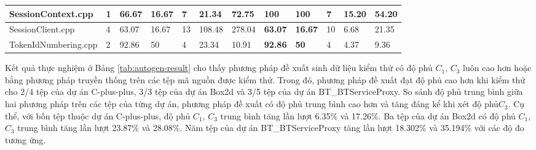 \begin{table}[h]
{\begin{tabular}{|l|l|lllll|lllll|}
SessionContext.cpp                                   & 1                                                   & \multicolumn{1}{l|}{66.67} & \multicolumn{1}{l|}{16.67} & \multicolumn{1}{l|}{7}   & \multicolumn{1}{l|}{21.34}   & 72.75                     & \multicolumn{1}{l|}{\textbf{100}}   & \multicolumn{1}{l|}{\textbf{100}}   & \multicolumn{1}{l|}{7}   & \multicolumn{1}{l|}{15.20}   & 54.20                     \\ \hline
SessionClient.cpp                                    & 4                                                   & \multicolumn{1}{l|}{63.07} & \multicolumn{1}{l|}{16.67} & \multicolumn{1}{l|}{13}  & \multicolumn{1}{l|}{108.48}  & 278.04                    & \multicolumn{1}{l|}{\textbf{63.07}} & \multicolumn{1}{l|}{\textbf{16.67}} & \multicolumn{1}{l|}{10}  & \multicolumn{1}{l|}{6.68}    & 21.35                     \\ \hline
TokenIdNumbering.cpp                                 & 2                                                   & \multicolumn{1}{l|}{92.86} & \multicolumn{1}{l|}{50}    & \multicolumn{1}{l|}{4}   & \multicolumn{1}{l|}{23.34}   & 10.91                     & \multicolumn{1}{l|}{\textbf{92.86}} & \multicolumn{1}{l|}{\textbf{50}}    & \multicolumn{1}{l|}{4}   & \multicolumn{1}{l|}{4.37}    & 9.36                      \\ \hline
\end{tabular}%
}
\end{table}

Kết quả thực nghiệm ở Bảng \ref{tab:autogen-result} cho thấy phương pháp đề xuất sinh dữ liệu kiểm thử có độ phủ $C_1$, $C_3$ luôn cao hơn hoặc bằng phương pháp truyền thống trên các tệp mã nguồn được kiểm thử. Trong đó, phương pháp đề xuất đạt độ phủ cao hơn khi kiểm thử cho 2/4 tệp của dự án C-plus-plus, 3/3 tệp của dự án Box2d và 3/5 tệp của dự án BT\_BTServiceProxy. So sánh độ phủ trung bình giữa hai phương pháp trên các tệp của từng dự án, phương pháp đề xuất có độ phủ trung bình cao hơn và tăng đáng kể khi xét độ phủ$C_3$. Cụ thể, với bốn tệp thuộc dự án C-plus-plus, độ phủ $C_1$, $C_3$ trung bình tăng lần lượt 6.35\% và 17.26\%. Ba tệp của dự án Box2d có độ phủ $C_1$, $C_3$ trung bình tăng lần lượt 23.87\% và 28.08\%. Năm tệp của dự án BT\_BTServiceProxy tăng lần lượt 18.302\% và 35.194\% với các độ đo tương ứng.

